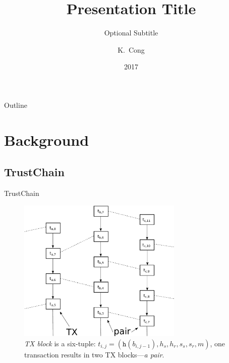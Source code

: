 \documentclass{beamer}
\title{Presentation Title}
\subtitle{Optional Subtitle}
\author{K.~Cong}
\institute[Delft University of Technology] %
{
  Faculty of Electrical Engineering, Mathematics and Computer Science\\
  Delft University of Technology}
\date{2017}
\begin{document}
\begin{frame}
  \titlepage
\end{frame}

\begin{frame}{Outline}
  \tableofcontents
\end{frame}

\section{Background}

\subsection{TrustChain}

\begin{frame}{TrustChain}{}

  \begin{figure}[h]
  \includegraphics[width=0.7\textwidth]{figures/trustchain-good}
  \centering
  \caption{\emph{TX block} is a six-tuple: $t_{i,j} = (\texttt{h}(b_{i,j-1}),
    h_s, h_r, s_s, s_r, m)$, one transaction results in two TX blocks---\emph{a
      pair}.}
  \end{figure}

\end{frame}
\end{document}
